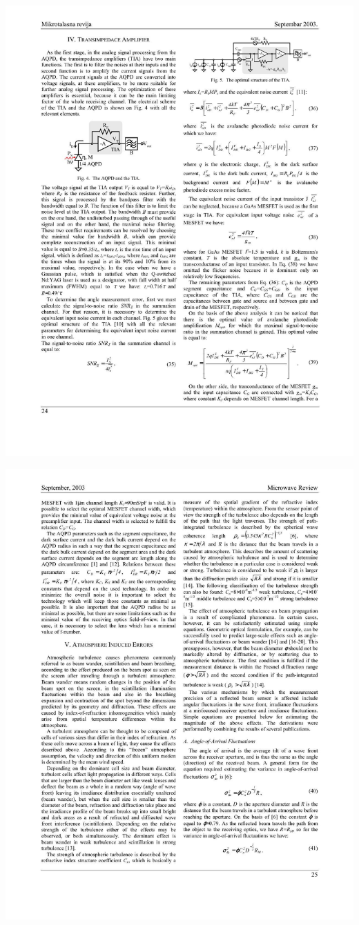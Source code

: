 \documentclass[10pt]{article}
\begin{document}
\includegraphics[max width=\textwidth]{d2750892714501b765cfde22b041f38a-06}

\includegraphics[max width=\textwidth]{d2750892714501b765cfde22b041f38a-07}
\end{document}
